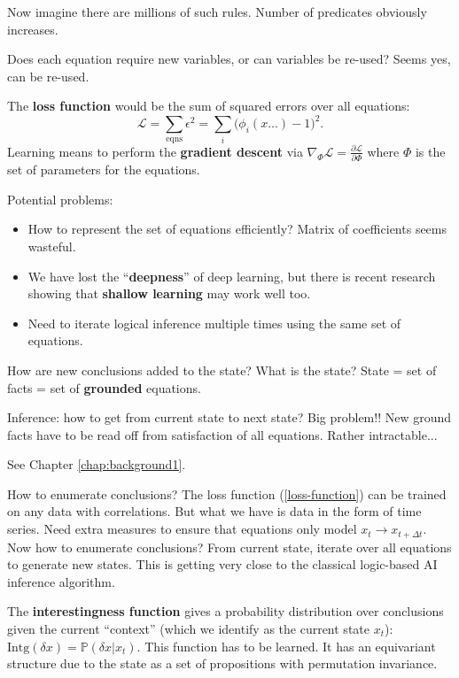 Now imagine there are millions of such rules.  Number of predicates obviously increases.

Does each equation require new variables, or can variables be re-used? Seems yes, can be re-used.

The \textbf{loss function} would be the sum of squared errors over all equations:
\begin{equation}
\mathcal{L} = \sum_{\mathrm{eqns}} \epsilon^2 = \sum_i \big( \phi_i (x...) - 1 \big)^2 .
\label{loss-function}
\end{equation}
Learning means to perform the \textbf{gradient descent} via $ \nabla_\Phi \mathcal{L} = \frac{\partial \mathcal{L}}{\partial \Phi} $ where $\Phi$ is the set of parameters for the equations.

Potential problems:
\begin{itemize}
	\item How to represent the set of equations efficiently?  Matrix of coefficients seems wasteful.
	\item We have lost the ``\textbf{deepness}'' of deep learning, but there is recent research showing that \textbf{shallow learning} may work well too.
	\item Need to iterate logical inference multiple times using the same set of equations.
\end{itemize}

How are new conclusions added to the state?  What is the state?  State = set of facts = set of \textbf{grounded} equations.

Inference:  how to get from current state to next state?  Big problem!!  New ground facts have to be read off from satisfaction of all equations.  Rather intractable...

See Chapter \ref{chap:background1}.

How to enumerate conclusions?  The loss function (\ref{loss-function}) can be trained on any data with correlations.  But what we have is data in the form of time series.  Need extra measures to ensure that equations only model $x_t \rightarrow x_{t+\Delta t}$.  Now how to enumerate conclusions?  From current state, iterate over all equations to generate new states.  This is getting very close to the classical logic-based AI inference algorithm.

The \textbf{interestingness function} gives a probability distribution over conclusions given the current ``context'' (which we identify as the current state $x_t$): $ \mathrm{Intg}(\delta x) = \mathbb{P}(\delta x | x_t) $.  This function has to be learned.  It has an equivariant structure due to the state as a set of propositions with permutation invariance.

